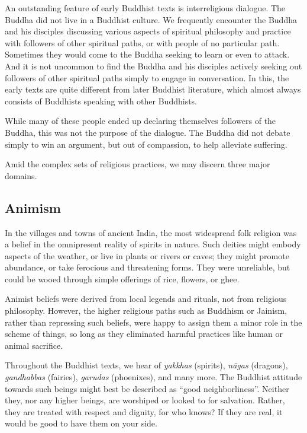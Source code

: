 \documentclass[12pt,openany]{book}%
\begin{document}
An outstanding feature of early Buddhist texts is interreligious dialogue. The Buddha did not live in a Buddhist culture. We frequently encounter the Buddha and his disciples discussing various aspects of spiritual philosophy and practice with followers of other spiritual paths, or with people of no particular path. Sometimes they would come to the Buddha seeking to learn or even to attack. And it is not uncommon to find the Buddha and his disciples actively seeking out followers of other spiritual paths simply to engage in conversation. In this, the early texts are quite different from later Buddhist literature, which almost always consists of Buddhists speaking with other Buddhists.

While many of these people ended up declaring themselves followers of the Buddha, this was not the purpose of the dialogue. The Buddha did not debate simply to win an argument, but out of compassion, to help alleviate suffering.

Amid the complex sets of religious practices, we may discern three major domains.

\subsection*{Animism}

In the villages and towns of ancient India, the most widespread folk religion was a belief in the omnipresent reality of spirits in nature. Such deities might embody aspects of the weather, or live in plants or rivers or caves; they might promote abundance, or take ferocious and threatening forms. They were unreliable, but could be wooed through simple offerings of rice, flowers, or ghee.

Animist beliefs were derived from local legends and rituals, not from religious philosophy. However, the higher religious paths such as Buddhism or Jainism, rather than repressing such beliefs, were happy to assign them a minor role in the scheme of things, so long as they eliminated harmful practices like human or animal sacrifice.

Throughout the Buddhist texts, we hear of \textit{yakkhas} (spirits), \textit{\textsanskrit{nāgas}} (dragons), \textit{gandhabbas} (fairies), \textit{garudas} (phoenixes), and many more. The Buddhist attitude towards such beings might best be described as “good neighborliness”. Neither they, nor any higher beings, are worshiped or looked to for salvation. Rather, they are treated with respect and dignity, for who knows? If they are real, it would be good to have them on your side.
\end{document}
